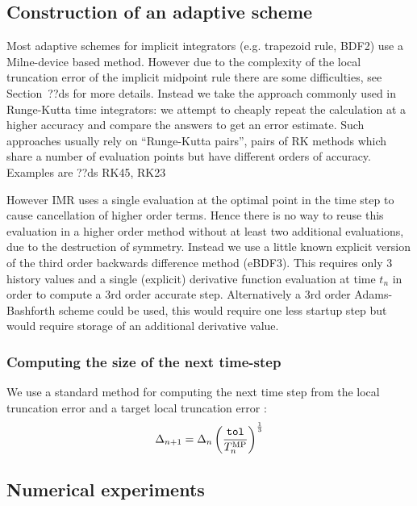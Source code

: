 \subsection{Construction of an adaptive scheme}

Most adaptive schemes for implicit integrators (e.g. trapezoid rule, BDF2) use a Milne-device based method.\cite{gresho-sani} %
However due to the complexity of the local truncation error of the implicit midpoint rule there are some difficulties, see Section~??ds for more details.
Instead we take the approach commonly used in Runge-Kutta time integrators: we attempt to cheaply repeat the calculation at a higher accuracy and compare the answers to get an error estimate.
Such approaches usually rely on ``Runge-Kutta pairs'', pairs of RK methods which share a number of evaluation points but have different orders of accuracy.
Examples are ??ds RK45, RK23 \cite{??ds}

However IMR uses a single evaluation at the optimal point in the time step to cause cancellation of higher order terms.
Hence there is no way to reuse this evaluation in a higher order method without at least two additional evaluations, due to the destruction of symmetry.
Instead we use a little known explicit version of the third order backwards difference method (eBDF3).
This requires only 3 history values and a single (explicit) derivative function evaluation at time $t_n$ in order to compute a 3rd order accurate step.
Alternatively a 3rd order Adams-Bashforth scheme could be used, this would require one less startup step but would require storage of an additional derivative value.




\subsubsection{Computing the size of the next time-step}

We use a standard method for computing the next time step from the local truncation error and a target local truncation error \toltt:\cite[pg.268]{Gresho-Sani}
\begin{equation}
\Delta_{n+1} = \Delta_{n} \left( \frac{{\textrm{\textup{\texttt{tol}}}}}{T_n^{\text{MP}}}  \right) ^{\frac{1}{3}}
\end{equation}


\subsection{Numerical experiments}

